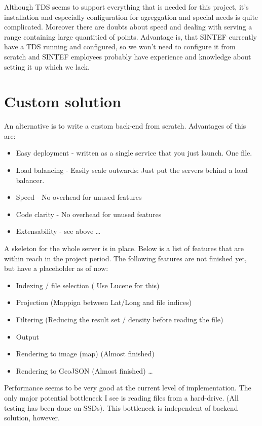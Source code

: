 \documentclass[11pt,a4paper,titlepage,oneside]{report}
\begin{document}
  Although TDS seems to support everything that is needed for this project, it's installation and especially configuration for agreggation and special needs is quite complicated. Moreover there are doubts about speed and dealing with serving a range containing large quantitied of points. Advantage is, that SINTEF currently have a TDS running and configured, so we won't need to configure it from scratch and SINTEF employees probably have experience and knowledge about setting it up which we lack.

  \section{Custom solution}
  An alternative is to write a custom back-end from scratch.
  Advantages of this are:
  \begin{itemize}
  \item Easy deployment - written as a single service that you just launch. One file.
  \item Load balancing - Easily scale outwards: Just put the servers behind a load balancer.
  \item Speed - No overhead for unused features
  \item Code clarity - No overhead for unused features
  \item Extensability - see above \ldots
  \end{itemize}
  A skeleton for the whole server is in place. Below is a list of features that are within reach in the project period. 
  The following features are not finished yet, but have a placeholder as of now:
  \begin{itemize}
  \item Indexing / file selection ( Use Lucene for this)
  \item Projection (Mappign between Lat/Long and file indices)
  \item Filtering (Reducing the result set / density before reading the file)
  \item Output
  \item Rendering to image (map) (Almost finished)
  \item Rendering to GeoJSON (Almost finished) \ldots
  \end{itemize}

  Performance seems to be very good at the current level of implementation. The only major potential bottleneck I see is reading files from a hard-drive. (All testing has been done on SSDs). This bottleneck is independent of backend solution, however.
  
\end{document}
